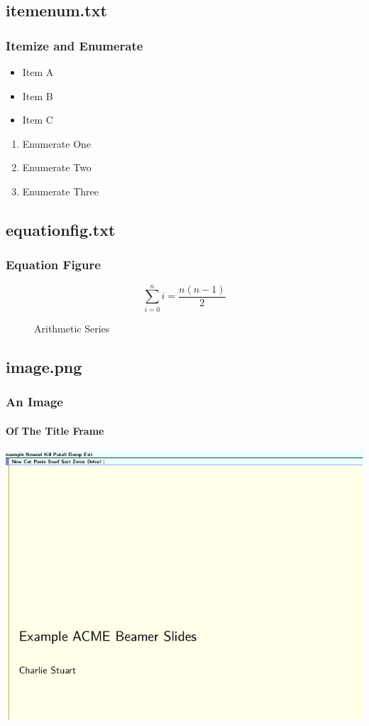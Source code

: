 \documentclass[10pt]{beamer}
\begin{document}
\subsection{itemenum.txt}
\begin{frame}
	\frametitle{Itemize and Enumerate}

	\begin{itemize}
	\item Item A
	\item Item B
	\item Item C
	\end{itemize}

	\begin{enumerate}
	\item Enumerate One
	\item Enumerate Two
	\item Enumerate Three
	\end{enumerate}
\end{frame}

\subsection{equationfig.txt}
\begin{frame}
	\frametitle{Equation Figure}


	\begin{figure}
		\[ \sum_{i=0}^n i =  \frac{n(n-1)}{2} \]
		\caption{Arithmetic Series}
	\end{figure}
\end{frame}

\subsection{image.png}
\begin{frame}
	\frametitle{An Image}
	\framesubtitle{Of The Title Frame}
	
	\begin{center}
	\includegraphics[scale=0.5]{example.png}
	\end{center}
\end{frame}
\end{document}
